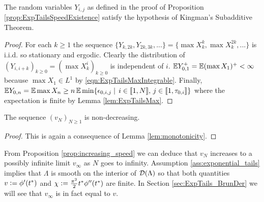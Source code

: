 \begin{lemma}\label{lem:ExpTailsKingmanHolds}
The random variables $Y_{i,j}$ as defined in the proof of Proposition \ref{prop:ExpTailsSpeedExistence} satisfy the hypothesis of Kingman's Subadditive Theorem. 
\end{lemma}

\begin{proof}
For each $k \geq 1$ the sequence $\{Y_{k, 2k}, Y_{2k, 3k}, ...\} = \{\max X^k_k, \max X^{2k}_k, ... \}$ is i.i.d. so stationary and ergodic. Clearly the distribution of $(Y_{i, i + k})_{k \geq 0} = (\max X^i_k)_{k \geq 0}$ is independent of $i$. $\E Y^+_{0,1} = \E (\max X_1)^+ < \infty$ because $\max X_1 \in L^1$ by \ref{eqn:ExpTailsMaxIntegrable}. Finally, $\E Y_{0, n} = \E \max X_n \geq n\, \E \min\{\epsilon_{0, i, j} \mid\, i \in \bbracket{1,N},\, j \in \bbracket{1, \tau_{0, i}}\}$ where the expectation is finite by Lemma \ref{lem:ExpTailsMax}. 
\end{proof}

\begin{proposition}\label{prop:increasing_speed}
The sequence $(v_N)_{N \geq 1}$ is non-decreasing. 
\end{proposition}
\begin{proof}
This is again a consequence of Lemma \ref{lem:monotonicity}. 
\end{proof}

\begin{remark}\label{rem:constants}
From Proposition \ref{prop:increasing_speed} we can deduce that $v_N$ increases to a possibly infinite limit $v_\infty$ as $N$ goes to infinity. Assumption \ref{ass:exponential_tails} implies that $\Lambda$ is smooth on the interior of $\cal{D}(\Lambda)$ so that both quantities $v \defeq \phi'(t^*)$ and $\chi \defeq \frac{\pi^2}{2} t^* \phi''(t^*)$ are finite. In Section \ref{sec:ExpTails_BrunDer} we will see that $v_\infty$ is in fact equal to $v$. 
\end{remark}

